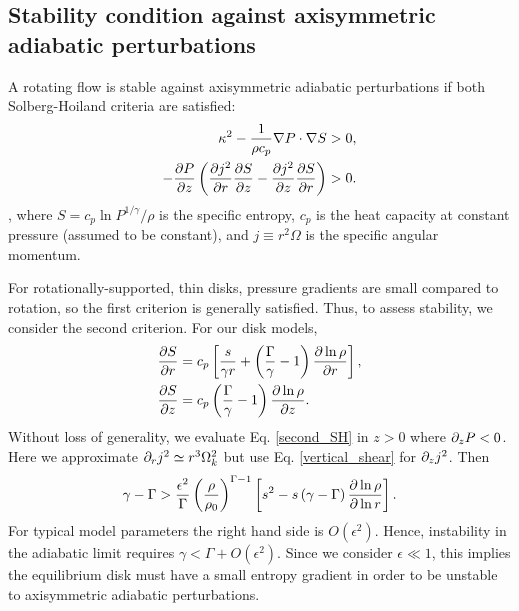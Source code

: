 \subsection{Stability condition against axisymmetric adiabatic
  perturbations}\label{solberg}
A rotating flow is stable against axisymmetric adiabatic perturbations
if both Solberg-Hoiland criteria  are satisfied:
\begin{align}
  \kappa^2 - \frac{1}{\rho c_p}\nabla P \cdot \nabla S &> 0,\\
  -\frac{\partial P}{\partial z}\left(\frac{\partial j^2}{\partial r}\frac{\partial S}{ \partial z} -
    \frac{\partial j^2}{\partial z}\frac{\partial S}{\partial r} \right)&>0. \label{second_SH} 
\end{align}
\citep{tassoul78}, where $S = c_p\ln{P^{1/\gamma}/\rho}$ is the
specific entropy, $c_p$ is the heat capacity at constant
pressure (assumed to be constant), and $j\equiv r^2\Omega$ is the
specific angular momentum.   

For rotationally-supported, thin disks, pressure gradients are small 
compared to rotation, so the first criterion is generally
satisfied. Thus, to assess stability, we consider the second
criterion. For our disk models,
\begin{align}
  &\frac{\partial S}{\partial r} = c_p\left[\frac{s}{\gamma r} +
    \left(\frac{\Gamma}{\gamma}-1\right)\frac{\partial \ln{\rho}}{\partial
       r}\right],\\
  &\frac{\partial S}{\partial z} = c_p
  \left(\frac{\Gamma}{\gamma}-1\right)\frac{\partial \ln{\rho}}{\partial z}. 
\end{align} 
Without loss of generality, we evaluate Eq. \ref{second_SH} in $z>0$
where $\partial_zP<0$. Here we approximate $\partial_r j^2\simeq r^3\Omega_k^2$ but
use Eq. \ref{vertical_shear} for $\partial_zj^2$. Then 
\begin{align}\label{solberg2}
  \gamma - \Gamma > \frac{\epsilon^2}{\Gamma}
  \left(\frac{\rho}{\rho_0}\right)^{\Gamma-1} \left[s^2
    -s\left(\gamma-\Gamma\right)\frac{\partial\ln{\rho}}{\partial\ln{r}} \right]. 
\end{align} 
For typical model parameters the right hand side is
$O(\epsilon^2)$. Hence, instability in the adiabatic limit 
requires $\gamma < \Gamma + O(\epsilon^2)$. Since we consider
$\epsilon\ll1$, this implies the equilibrium disk must have a small
entropy gradient in order to be unstable to axisymmetric adiabatic
perturbations. 

